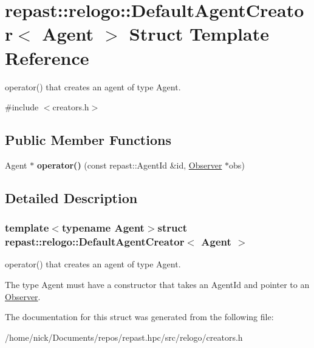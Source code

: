 \hypertarget{structrepast_1_1relogo_1_1_default_agent_creator}{\section{repast\-:\-:relogo\-:\-:Default\-Agent\-Creator$<$ Agent $>$ Struct Template Reference}
\label{structrepast_1_1relogo_1_1_default_agent_creator}
}


operator() that creates an agent of type Agent.  




{\ttfamily \#include $<$creators.\-h$>$}

\subsection*{Public Member Functions}
\begin{DoxyCompactItemize}
\item 
\hypertarget{structrepast_1_1relogo_1_1_default_agent_creator_a56e7418784408bb366790b8ca7363e3a}{Agent $\ast$ {\bfseries operator()} (const repast\-::\-Agent\-Id \&id, \hyperlink{classrepast_1_1relogo_1_1_observer}{Observer} $\ast$obs)}\label{structrepast_1_1relogo_1_1_default_agent_creator_a56e7418784408bb366790b8ca7363e3a}

\end{DoxyCompactItemize}


\subsection{Detailed Description}
\subsubsection*{template$<$typename Agent$>$struct repast\-::relogo\-::\-Default\-Agent\-Creator$<$ Agent $>$}

operator() that creates an agent of type Agent. 

The type Agent must have a constructor that takes an Agent\-Id and pointer to an \hyperlink{classrepast_1_1relogo_1_1_observer}{Observer}. 

The documentation for this struct was generated from the following file\-:\begin{DoxyCompactItemize}
\item 
/home/nick/\-Documents/repos/repast.\-hpc/src/relogo/creators.\-h\end{DoxyCompactItemize}
